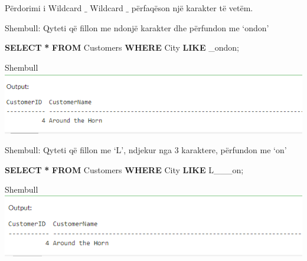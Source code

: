 \documentclass[
  ignorenonframetext,
]{beamer}
\newenvironment{Shaded}{\begin{snugshade}}{\end{snugshade}}
\newcommand{\KeywordTok}[1]{\textcolor[rgb]{0.13,0.29,0.53}{\textbf{#1}}}
\newcommand{\NormalTok}[1]{#1}
\newcommand{\OperatorTok}[1]{\textcolor[rgb]{0.81,0.36,0.00}{\textbf{#1}}}
\newcommand{\StringTok}[1]{\textcolor[rgb]{0.31,0.60,0.02}{#1}}
\begin{document}
\begin{frame}{Përdorimi i Wildcard \(\_\)}
\label{puxebrdorimi-i-wildcard-_}
Wildcard \(\_\) përfaqëson një karakter të vetëm.
\end{frame}

\begin{frame}[fragile]{Shembull: Qyteti që fillon me ndonjë karakter dhe
përfundon me `ondon'}
\label{shembull-qyteti-quxeb-fillon-me-ndonjuxeb-karakter-dhe-puxebrfundon-me-ondon}
\begin{Shaded}
\begin{Highlighting}[]
\KeywordTok{SELECT} \OperatorTok{*}
\KeywordTok{FROM}\NormalTok{ Customers}
\KeywordTok{WHERE}\NormalTok{ City }\KeywordTok{LIKE} \StringTok{\textquotesingle{}\_ondon\textquotesingle{}}\NormalTok{;}
\end{Highlighting}
\end{Shaded}
\end{frame}

\begin{frame}{Shembull}
\label{shembull-14}
\includegraphics{./Figs/query69.png}
\end{frame}

\begin{frame}[fragile]{Shembull: Qyteti që fillon me `L', ndjekur nga 3
karaktere, përfundon me `on'}
\label{shembull-qyteti-quxeb-fillon-me-l-ndjekur-nga-3-karaktere-puxebrfundon-me-on}
\begin{Shaded}
\begin{Highlighting}[]
\KeywordTok{SELECT} \OperatorTok{*}
\KeywordTok{FROM}\NormalTok{ Customers}
\KeywordTok{WHERE}\NormalTok{ City }\KeywordTok{LIKE} \StringTok{\textquotesingle{}L\_\_\_on\textquotesingle{}}\NormalTok{;}
\end{Highlighting}
\end{Shaded}
\end{frame}

\begin{frame}{Shembull}
\label{shembull-15}
\includegraphics{./Figs/query70.png}
\end{frame}
\end{document}
